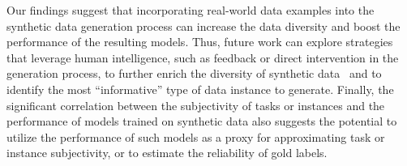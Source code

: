 Our findings suggest that incorporating real-world data examples into the synthetic data generation process can increase the data diversity and boost the performance of the resulting models. Thus, future work can explore strategies that leverage human intelligence, such as feedback or direct intervention in the generation process, to further enrich the diversity of synthetic data~\cite{chung2023increasing} and to identify the most ``informative'' type of data instance to generate.  Finally, the significant correlation between the subjectivity of tasks or instances and the performance of models trained on synthetic data also suggests the potential to utilize the performance of such models as a proxy for approximating task or instance subjectivity, or to estimate the reliability of gold labels.

\clearpage


